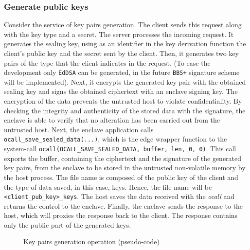 \subsubsection{Generate public keys}
Consider the service of key pairs generation. The client sends this request along with the key type and a secret. The server processes the incoming request. It generates the sealing key, using as an identifier in the key derivation function the client's public key and the secret sent by the client. Then, it generates two key pairs of the type that the client indicates in the request. (To ease the development only \texttt{EdDSA} can be generated, in the future \texttt{BBS+} signature scheme will be implemented). 
Next, it encrypts the generated key pair with the obtained sealing key and signs the obtained ciphertext with an enclave signing key. 
The encryption of the data prevents the untrusted host to violate confidentiality.
By checking the integrity and authenticity of the stored data with the signature, the enclave is able to verify that no alteration has been carried out from the untrusted host.
Next, the enclave application calls \texttt{ocall\_save\_sealed\_data(...)}, which is the edge wrapper function to the system-call \texttt{ocall(OCALL\_SAVE\_SEALED\_DATA, buffer, len, 0, 0)}. This call exports the buffer, containing the ciphertext and the signature of the generated key pairs, from the enclave to be stored in the untrusted non-volatile memory by the host process. The file name is composed of the public key of the client and the type of data saved, in this case, keys. Hence, the file name will be \texttt{<client\_pub\_key>\_keys}. 
The host saves the data received with the \textit{ocall} and returns the control to the enclave. 
Finally, the enclave sends the response to the host, which will proxies the response back to the client. The response contains only the public part of the generated keys. \\

\begin{figure}[!tb]
    \centering
    
    \caption{Key pairs generation operation (pseudo-code)}
    \label{poc-gen-keys}
\end{figure}

